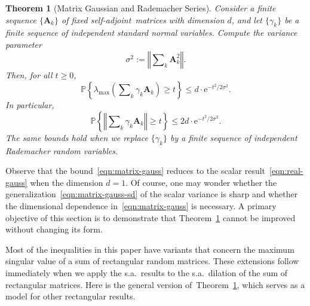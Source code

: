 \documentclass[11pt,letterpaper,twoside,reqno,draft]{amsart}
\newtheorem{thm}{Theorem}
\theoremstyle{remark}
\numberwithin{equation}{section}
\numberwithin{thm}{section}
\begin{document}
\begin{thm}[Matrix Gaussian and Rademacher Series] \label{thm:rad-gauss-series}
Consider a finite sequence $\{ {\bm{{A}}}_k \}$ of fixed self-adjoint~matrices with dimension $d$, and let $\{\gamma_k\}$ be a finite sequence of independent standard normal variables.  Compute the variance parameter
\begin{equation} \label{eqn:matrix-gauss-sd}
\sigma^2 := {\left\Vert {{ \sum\nolimits_k {\bm{{A}}}_k^2 }} \right\Vert}.
\end{equation}
Then, for all $t \geq 0$,
\begin{equation} \label{eqn:matrix-gauss}
{\mathbb{P}\left\{ {{ \lambda_{\max}\left( \sum\nolimits_k \gamma_k {\bm{{A}}}_k \right) \geq t}} \right\}}
	\leq d \cdot {\mathrm{e}}^{- t^2 / 2\sigma^2}.
\end{equation}
In particular,
\begin{equation} \label{eqn:twosided-matrix-gauss}
{\mathbb{P}\left\{ {{ {\left\Vert {{ \sum\nolimits_k \gamma_k {\bm{{A}}}_k }} \right\Vert} \geq t}} \right\}}
	\leq 2d \cdot {\mathrm{e}}^{- t^2 / 2\sigma^2}.
\end{equation}
The same bounds hold when we replace $\{\gamma_k\}$ by a finite sequence of independent Rademacher random variables.
\end{thm}

Observe that the bound~\eqref{eqn:matrix-gauss} reduces to the scalar result~\eqref{eqn:real-gauss} when the dimension $d = 1$.
Of course, one may wonder whether the generalization~\eqref{eqn:matrix-gauss-sd} of the scalar variance is sharp and whether the dimensional dependence in~\eqref{eqn:matrix-gauss} is necessary.  A primary objective of this section is to demonstrate that Theorem~\ref{thm:rad-gauss-series} cannot be improved without 
changing its form.

Most of the inequalities in this paper have variants that concern the maximum singular value of a sum of rectangular random matrices.
These extensions follow immediately when we apply the s.a.~results to the s.a.~dilation of the sum of rectangular matrices.  Here is the general version of~Theorem~\ref{thm:rad-gauss-series}, which serves as a model for other rectangular results.
\end{document}

